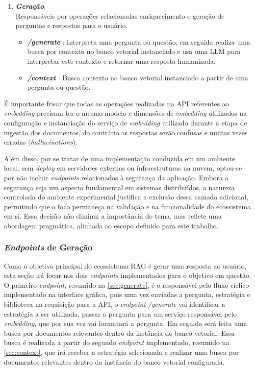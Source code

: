 \documentclass[a4paper, 12pt]{article}
\begin{document}
\begin{enumerate}
\begin{itemize}
        \end{itemize}
        \item \textbf{\textit{Geração}}:\\ Responsáveis por operações relacionadas enriquecimento e geração de perguntas e respostas para o usuário.
        \begin{itemize}
            \item \textbf{\textit{/generate}} \label{sec:generate}: Interpreta uma pergunta ou questão, em seguida realiza uma busca por contexto no banco vetorial instanciado e usa uma LLM para interpretar este contexto e retornar uma resposta humanizada.
            \item \textbf{\textit{/context}} \label{sec:context}: Busca contexto no banco vetorial instanciado a partir de uma pergunta ou questão.
        \end{itemize}
    \end{enumerate}

    É importante frisar que todas as operações realizadas na API referentes ao \textit{embedding} precisam ter o mesmo modelo e dimensões de \textit{embedding} utilizados na configuração e instanciação do serviço de \textit{embedding} utilizado durante a etapa de ingestão dos documentos, do contrário as respostas serão confusas e muitas vezes erradas (\textit{hallucinations}).

    Além disso, por se tratar de uma implementação conduzida em um ambiente local, sem \textit{deploy} em servidores externos ou infraestruturas na nuvem, optou-se por não incluir \textit{endpoints} relacionados à segurança da aplicação. Embora a segurança seja um aspecto fundamental em sistemas distribuídos, a natureza controlada do ambiente experimental justifica a exclusão dessa camada adicional, permitindo que o foco permaneça na validação e na funcionalidade do ecossistema em si. Essa decisão não diminui a importância do tema, mas reflete uma abordagem pragmática, alinhada ao escopo definido para este trabalho.

    \subsubsection{\textit{Endpoints} de Geração}

    Como o objetivo principal do ecossistema RAG é gerar uma resposta ao usuário, esta seção irá focar nos dois \textit{endpoints} implementados para o objetivo em questão. O primeiro \textit{endpoint}, resumido na \autoref{sec:generate}, é o responsável pelo fluxo cíclico implementado na interface gráfica, pois uma vez enviadas a pergunta, estratégia e biblioteca na requisição para a API, o \textit{endpoint} \textit{/generate} vai identificar a estratégia a ser utilizada, passar a pergunta para um serviço responsável pelo \textit{embedding}, que por sua vez vai formatará a pergunta. Em seguida será feita uma busca por documentos relevantes dentro da instância do banco vetorial. Essa busca é realizada a partir do segundo \textit{endpoint} implementado, resumido na \autoref{sec:context}, que irá receber a estratégia selecionada e realizar uma busca por documentos relevantes dentro da instância do banco vetorial configurada.
\end{document}

